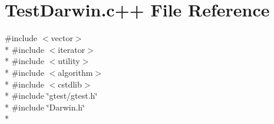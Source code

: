 \hypertarget{TestDarwin_8c_09_09}{\section{Test\-Darwin.\-c++ File Reference}
\label{TestDarwin_8c_09_09}
}
{\ttfamily \#include $<$vector$>$}\\*
{\ttfamily \#include $<$iterator$>$}\\*
{\ttfamily \#include $<$utility$>$}\\*
{\ttfamily \#include $<$algorithm$>$}\\*
{\ttfamily \#include $<$cstdlib$>$}\\*
{\ttfamily \#include \char`\"{}gtest/gtest.\-h\char`\"{}}\\*
{\ttfamily \#include \char`\"{}Darwin.\-h\char`\"{}}\\*
